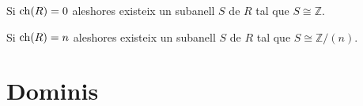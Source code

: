 \documentclass[../Apunts.tex]{subfiles}
\begin{document}
	\begin{corollary}
		\label{corollary:subcos isomorf respecte caracteristica}
		Si \(\operatorname{ch}(R)=0\) aleshores existeix un subanell \(S\) de \(R\) tal que \(S\cong\mathbb{Z}\).
		
		Si \(\operatorname{ch}(R)=n\) aleshores existeix un subanell \(S\) de \(R\) tal que \(S\cong\mathbb{Z}/(n)\).
	\end{corollary}
	\section{Dominis}
\end{document}
